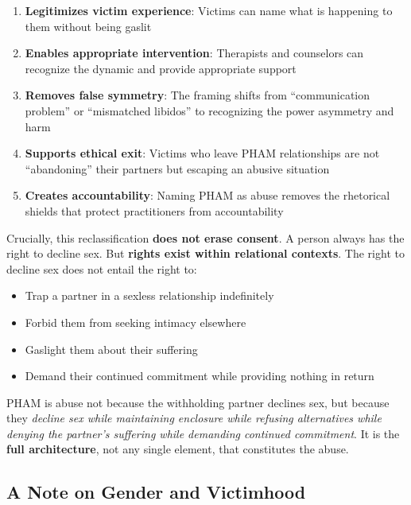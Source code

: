 \documentclass[12pt,openany]{book}
\numberwithin{equation}{chapter}
\begin{document}
\begin{enumerate}
    \item \textbf{Legitimizes victim experience}: Victims can name what is happening to them without being gaslit
    
    \item \textbf{Enables appropriate intervention}: Therapists and counselors can recognize the dynamic and provide appropriate support
    
    \item \textbf{Removes false symmetry}: The framing shifts from ``communication problem'' or ``mismatched libidos'' to recognizing the power asymmetry and harm
    
    \item \textbf{Supports ethical exit}: Victims who leave PHAM relationships are not ``abandoning'' their partners but escaping an abusive situation
    
    \item \textbf{Creates accountability}: Naming PHAM as abuse removes the rhetorical shields that protect practitioners from accountability
\end{enumerate}

Crucially, this reclassification \textbf{does not erase consent}. A person always has the right to decline sex. But \textbf{rights exist within relational contexts}. The right to decline sex does not entail the right to:

\begin{itemize}
    \item Trap a partner in a sexless relationship indefinitely
    \item Forbid them from seeking intimacy elsewhere
    \item Gaslight them about their suffering
    \item Demand their continued commitment while providing nothing in return
\end{itemize}

PHAM is abuse not because the withholding partner declines sex, but because they \textit{decline sex while maintaining enclosure while refusing alternatives while denying the partner's suffering while demanding continued commitment}. It is the \textbf{full architecture}, not any single element, that constitutes the abuse.

\subsection{A Note on Gender and Victimhood}
\end{document}
